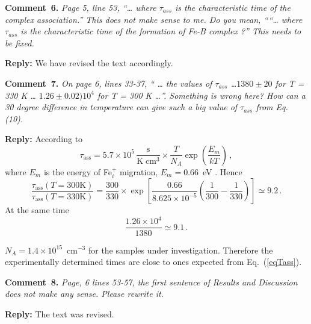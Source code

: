 \documentclass[sn-mathphys]{sn-jnl}
\begin{document}
\vspace{1cm}
\noindent
\textcolor[rgb]{0.00,0.50,1.00}{\textbf{Comment~6.}}
\emph{Page 5, line 53, “… where $\tau_{ass}$ is the characteristic time of the complex association.”
This does not make sense to me.
Do you mean, ““… where $\tau_{ass}$ is the characteristic time of the formation of Fe-B complex ?” This needs to be fixed.}

\noindent
\textcolor[rgb]{0.51,0.00,0.00}{\textbf{Reply:}}
We have revised the text accordingly.


\vspace{1cm}
\noindent
\textcolor[rgb]{0.00,0.50,1.00}{\textbf{Comment~7.}}
\emph{On page 6, lines 33-37, “ … the values of $\tau_{ass}$ …$1380 \pm20$  for T = 330 K … $1.26 \pm0.02) 10^4$  for T = 300 K …”.
Something is wrong here?
How can a 30 degree difference in temperature can give such a big value of $\tau_{ass}$ from Eq. (10).}

\noindent
\textcolor[rgb]{0.51,0.00,0.00}{\textbf{Reply:}}
According to \cite{FeBKin2019,FeBAssJAP2014,FeBAssSST2011}
\begin{equation}
\label{eqTass}
\tau_\mathrm{ass}=5.7\times10^5\,\frac{\mathrm{s}}{\mathrm{K}\;\mathrm{cm}^3}\times\frac{T}{N_A}\exp\left(\frac{E_m}{kT}\right)\,,
\end{equation}
where
$E_m$ is the energy of Fe$_i^+$ migration, $E_m=0.66$~eV \cite{FeBAssJAP2014,FeBkinAPL2008,FeBKin2019,FeBAssSST2011}.
Hence
\begin{equation}
\frac{\tau_\mathrm{ass}(T=300 \mathrm{K})}{\tau_\mathrm{ass}(T=330 \mathrm{K})}=
\frac{300}{330}\times \exp\left[\frac{0.66}{8.625\times10^{-5}}\left(\frac{1}{300}-\frac{1}{330}\right)\right]\simeq9.2\,.
\end{equation}
At the same time
\begin{equation}
\frac{1.26\times10^4}{1380}\simeq9.1\,.
\end{equation}

$N_A=1.4\times10^{15}$~cm$^{-3}$ for the samples under investigation.
Therefore the experimentally determined times are close to ones expected from Eq.~(\ref{eqTass}).




\vspace{1cm}
\noindent
\textcolor[rgb]{0.00,0.50,1.00}{\textbf{Comment~8.}}
\emph{Page, 6 lines 53-57, the first sentence of Results and Discussion does not make any sense.
Please rewrite it.}

\noindent
\textcolor[rgb]{0.51,0.00,0.00}{\textbf{Reply:}}
The text was revised.
\end{document}
